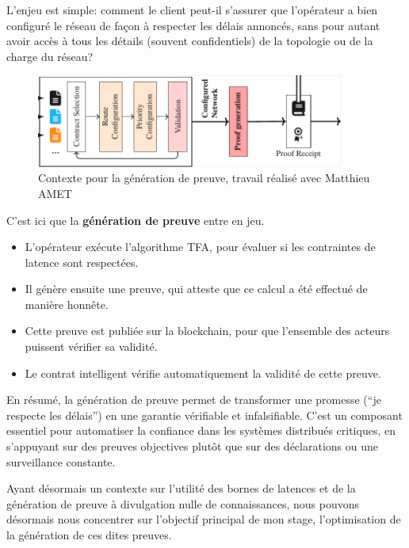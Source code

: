 \documentclass[12pt]{report}
\begin{document}
\bigskip

L'enjeu est simple: comment le client peut-il s'assurer que l'opérateur a bien configuré le réseau de façon à respecter les délais annoncés, sans pour autant avoir accès à tous les détails (souvent confidentiels) de la topologie ou de la charge du réseau?

\bigskip

\begin{figure}[h!]
  \begin{center}
  \includegraphics[width=0.9\textwidth]{main_cropped.pdf}
  \caption{Contexte pour la génération de preuve, travail réalisé avec Matthieu AMET}
  \end{center}
\end{figure}

\break


C'est ici que la \textbf{génération de preuve} entre en jeu.

\begin{itemize}
    \item L'opérateur exécute l'algorithme TFA, pour évaluer si les contraintes de latence sont respectées.
    \item Il génère ensuite une preuve, qui atteste que ce calcul a été effectué de manière honnête.
    \item Cette preuve est publiée sur la blockchain, pour que l'ensemble des acteurs puissent vérifier sa validité.
    \item Le contrat intelligent vérifie automatiquement la validité de cette preuve.
\end{itemize}

\medskip

En résumé, la génération de preuve permet de transformer une promesse (``je respecte les délais'') en une garantie vérifiable et infalsifiable. C'est un composant essentiel pour automatiser la confiance dans les systèmes distribués critiques, en s'appuyant sur des preuves objectives plutôt que sur des déclarations ou une surveillance constante.

\medskip

Ayant désormais un contexte sur l'utilité des bornes de latences
et de la génération de preuve à divulgation nulle de connaissances,
nous pouvons désormais nous concentrer sur l'objectif principal de
mon stage, l'optimisation de la génération de ces dites preuves.
\end{document}
